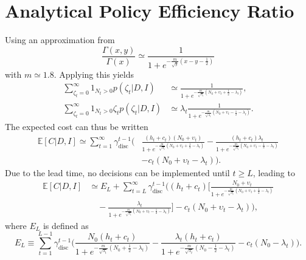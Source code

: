 \section{Analytical Policy Efficiency Ratio}
\label{app:cer}



Using an approximation from \cite{bartmann1992inventory}
\begin{equation}
	\frac{\Gamma(x,y)}{\Gamma(x)}\simeq \frac{1}{1+e^{-\frac{m}{\sqrt{y}}(x-y-\frac{1}{2})}}
\end{equation}
with $m\simeq 1.8$. Applying this yields
\begin{equation}
	\begin{split}
		\sum_{\zeta_t=0}^\infty1_{N_t> 0}p(\zeta_t| D, I) & \simeq \frac{1}{1+e^{-\frac{m}{\sqrt{\lambda_t}}(N_0+\upsilon_t+\frac{1}{2}-\lambda_t)}},\\
		\sum_{\zeta_t=0}^\infty1_{N_t> 0}\zeta_tp(\zeta_t| D, I) & \simeq \lambda_t\frac{1}{1+e^{-\frac{m}{\sqrt{\lambda_t}}(N_0+\upsilon_t-\frac{1}{2}-\lambda_t)}}.
	\end{split}
\end{equation}
The expected cost can thus be written
\begin{equation}
	\begin{split}
		\mathbb{E}[C|D,I] \simeq \sum_{t=1}^{\infty} \gamma_{\text{disc}}^{t-1} \bigg(& 
		\frac{(h_t+c_t)(N_0 + \upsilon_t)}{1+e^{-\frac{m}{\sqrt{\lambda_t}}(N_0+\upsilon_t+\frac{1}{2}-\lambda_t)}}- \frac{(h_t+c_t)\lambda_t}{1+e^{-\frac{m}{\sqrt{\lambda_t}}(N_0+\upsilon_t-\frac{1}{2}-\lambda_t)}}\\
		& - c_t(N_0 + \upsilon_t-\lambda_t)\bigg).
	\end{split}
\end{equation}
Due to the lead time, no decisions can be implemented until $t \geq L$, leading to
\begin{equation}
	\begin{split}
		\mathbb{E}[C|D,I] &\simeq E_L+\sum_{t=L}^{\infty} \gamma_{\text{disc}}^{t-1} \bigg( 
		(h_t+c_t)\bigg[\frac{N_0 + \upsilon_t}{1+e^{-\frac{m}{\sqrt{\lambda_t}}(N_0+\upsilon_t+\frac{1}{2}-\lambda_t)}}\\
		&\quad- \frac{\lambda_t}{1+e^{-\frac{m}{\sqrt{\lambda_t}}(N_0+\upsilon_t-\frac{1}{2}-\lambda_t)}}\bigg] - c_t(N_0 + \upsilon_t-\lambda_t)\bigg),
	\end{split}
\end{equation}
where $E_L$ is defined as
\begin{equation}
	E_L \equiv \sum_{t=1}^{L-1} \gamma_{\text{disc}}^{t-1} \bigg( 
	\frac{N_0(h_t+c_t)}{1+e^{-\frac{m}{\sqrt{\lambda_t}}(N_0+\frac{1}{2}-\lambda_t)}} - \frac{\lambda_t(h_t+c_t)}{1+e^{-\frac{m}{\sqrt{\lambda_t}}(N_0-\frac{1}{2}-\lambda_t)}} - c_t(N_0-\lambda_t)\bigg).
\end{equation}

